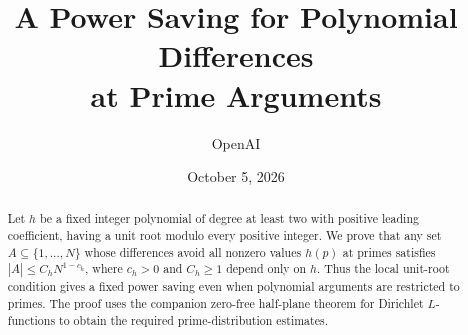\documentclass[11pt]{article}
\title{A Power Saving for Polynomial Differences\protect\\ at Prime Arguments}
\author{OpenAI}
\date{October 5, 2026}
\theoremstyle{definition}
\theoremstyle{remark}
\numberwithin{equation}{section}
\newcommand{\1}{\mathbf 1}
\begin{document}
\maketitle
\begin{abstract}
Let $h$ be a fixed integer polynomial of degree at least two with positive
leading coefficient, having a unit root modulo every positive integer.
We prove that any set $A\subseteq\{1,\ldots,N\}$ whose differences avoid
all nonzero values $h(p)$ at primes satisfies $|A|\le C_hN^{1-c_h}$,
where $c_h>0$ and $C_h\ge1$ depend only on $h$. Thus the local unit-root
condition gives a fixed power saving even when polynomial arguments are
restricted to primes. The proof uses the companion zero-free half-plane
theorem for Dirichlet $L$-functions to obtain the required prime-distribution
estimates.
\end{abstract}







\begingroup
\small\raggedright
\setlength{\bibsep}{4pt}


\endgroup
\end{document}
